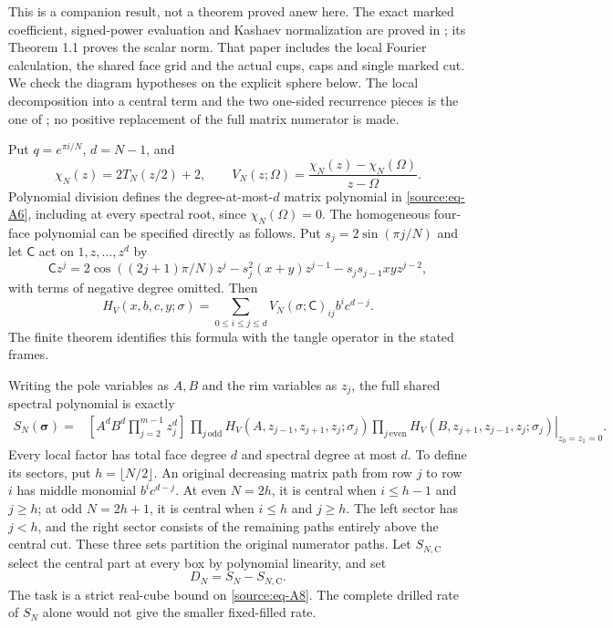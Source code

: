 \documentclass[11pt]{article}
\numberwithin{equation}{section}
\begin{document}
This is a companion result, not a theorem proved anew here.
The exact marked coefficient, signed-power evaluation and Kashaev
normalization are proved in \cite[Theorem 9.1, Corollary 9.2 and
Theorem 10.1]{FillingPaper}; its Theorem 1.1 proves the scalar norm.
That paper includes the local Fourier calculation, the shared face
grid and the actual cups, caps and single marked cut. We check the
diagram hypotheses on the explicit sphere below.
The local decomposition into a central
term and the two one-sided recurrence pieces is the one of
\cite[Section 2]{CasimirSources}; no positive replacement of the full
matrix numerator is made.

Put \(q=e^{\pi i/N}\), \(d=N-1\), and \begin{equation}\label{source:eq-A6}
\chi_N(z)=2T_N(z/2)+2,
 \qquad V_N(z;\Omega)=\frac{\chi_N(z)-\chi_N(\Omega)}{z-\Omega}.
\end{equation} Polynomial division defines the degree-at-most-\(d\) matrix
polynomial in \eqref{source:eq-A6}, including at every spectral root, since $\chi_N(\Omega)=0$.
The homogeneous four-face polynomial can be specified directly as
follows. Put $s_j=2\sin(\pi j/N)$ and let $\mathsf C$ act on
$1,z,\ldots,z^d$ by
\[
 \mathsf C z^j=2\cos((2j+1)\pi/N)z^j
 -s_j^2(x+y)z^{j-1}-s_js_{j-1}xy z^{j-2},
\]
with terms of negative degree omitted. Then
\[
 H_V(x,b,c,y;\sigma)=
 \sum_{0\le i\le j\le d}
          V_N(\sigma;\mathsf C)_{ij}b^ic^{d-j}.
\]
The finite theorem identifies this formula with the tangle operator
in the stated frames.

Writing the pole variables as \(A,B\) and the rim variables as \(z_j\),
the full shared spectral polynomial is exactly \begin{equation}\label{source:eq-A7}
\begin{split}
 S_N(\boldsymbol\sigma)
 ={}&[A^dB^d\prod_{j=2}^{m-1}z_j^d]\,
 \left.\prod_{j\,\mathrm{odd}}
 H_V(A,z_{j-1},z_{j+1},z_j;\sigma_j)
 \prod_{j\,\mathrm{even}}
 H_V(B,z_{j+1},z_{j-1},z_j;\sigma_j)
 \right|_{z_0=z_1=0}.
\end{split}
\end{equation} Every local factor has total face degree \(d\) and spectral degree at
most \(d\). To define its sectors, put \(h=\lfloor N/2\rfloor\).
An original decreasing matrix path from row \(j\) to row \(i\) has
middle monomial \(b^ic^{d-j}\). At even \(N=2h\), it is central when
\(i\le h-1\) and \(j\ge h\); at odd \(N=2h+1\), it is central when
\(i\le h\) and \(j\ge h\). The left sector has \(j<h\), and the
right sector consists of the remaining paths entirely above the central
cut. These three sets partition the original numerator paths. Let
\(S_{N,\mathrm C}\) select the central part at every box by polynomial
linearity, and set \begin{equation}\label{source:eq-A8}
D_N=S_N-S_{N,\mathrm C}.
\end{equation} The task is a strict real-cube bound on \eqref{source:eq-A8}. The complete drilled
rate of \(S_N\) alone would not give the smaller fixed-filled rate.
\end{document}
